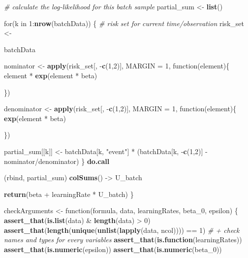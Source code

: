 \documentclass[]{article}
\newenvironment{Shaded}{\begin{snugshade}}{\end{snugshade}}
\newcommand{\KeywordTok}[1]{\textcolor[rgb]{0.13,0.29,0.53}{\textbf{{#1}}}}
\newcommand{\DataTypeTok}[1]{\textcolor[rgb]{0.13,0.29,0.53}{{#1}}}
\newcommand{\DecValTok}[1]{\textcolor[rgb]{0.00,0.00,0.81}{{#1}}}
\newcommand{\StringTok}[1]{\textcolor[rgb]{0.31,0.60,0.02}{{#1}}}
\newcommand{\CommentTok}[1]{\textcolor[rgb]{0.56,0.35,0.01}{\textit{{#1}}}}
\newcommand{\NormalTok}[1]{{#1}}
\begin{document}
\begin{Shaded}
\begin{Highlighting}[]
{  \CommentTok{# calculate the log-likelihood for this batch sample}
  \NormalTok{partial_sum <-}\StringTok{ }\KeywordTok{list}\NormalTok{()}
  
  \NormalTok{for(k in }\DecValTok{1}\NormalTok{:}\KeywordTok{nrow}\NormalTok{(batchData)) \{}
    \CommentTok{# risk set for current time/observation}
    \NormalTok{risk_set <-}\StringTok{ }\NormalTok{batchData %>%}\StringTok{ }\KeywordTok{filter}\NormalTok{(times >=}\StringTok{ }\NormalTok{batchData$times[k])}
    
    \NormalTok{nominator <-}\StringTok{ }\KeywordTok{apply}\NormalTok{(risk_set[, -}\KeywordTok{c}\NormalTok{(}\DecValTok{1}\NormalTok{,}\DecValTok{2}\NormalTok{)], }\DataTypeTok{MARGIN =} \DecValTok{1}\NormalTok{, function(element)\{}
      \NormalTok{element *}\StringTok{ }\KeywordTok{exp}\NormalTok{(element *}\StringTok{ }\NormalTok{beta)}
    \NormalTok{\}) %>%}\StringTok{ }\KeywordTok{rowSums}\NormalTok{()}
      
    \NormalTok{denominator <-}\StringTok{ }\KeywordTok{apply}\NormalTok{(risk_set[, -}\KeywordTok{c}\NormalTok{(}\DecValTok{1}\NormalTok{,}\DecValTok{2}\NormalTok{)], }\DataTypeTok{MARGIN =} \DecValTok{1}\NormalTok{, function(element)\{}
      \KeywordTok{exp}\NormalTok{(element *}\StringTok{ }\NormalTok{beta)}
    \NormalTok{\}) %>%}\StringTok{ }\KeywordTok{rowSums}\NormalTok{()}
      
    \NormalTok{partial_sum[[k]] <-}\StringTok{ }
\StringTok{      }\NormalTok{batchData[k, }\StringTok{"event"}\NormalTok{] *}\StringTok{ }\NormalTok{(batchData[k, -}\KeywordTok{c}\NormalTok{(}\DecValTok{1}\NormalTok{,}\DecValTok{2}\NormalTok{)] -}\StringTok{ }\NormalTok{nominator/denominator)}
  \NormalTok{\}}
  \KeywordTok{do.call}\NormalTok{(rbind, partial_sum) %>%}
\StringTok{    }\KeywordTok{colSums}\NormalTok{() ->}\StringTok{ }\NormalTok{U_batch}
  
  \KeywordTok{return}\NormalTok{(beta +}\StringTok{ }\NormalTok{learningRate *}\StringTok{ }\NormalTok{U_batch)}
\NormalTok{\}}
  
\NormalTok{checkArguments <-}\StringTok{ }\NormalTok{function(formula, data, learningRates,}
                             \NormalTok{beta_0, epsilon) \{}
  \KeywordTok{assert_that}\NormalTok{(}\KeywordTok{is.list}\NormalTok{(data) &}\StringTok{ }\KeywordTok{length}\NormalTok{(data) >}\StringTok{ }\DecValTok{0}\NormalTok{)}
  \KeywordTok{assert_that}\NormalTok{(}\KeywordTok{length}\NormalTok{(}\KeywordTok{unique}\NormalTok{(}\KeywordTok{unlist}\NormalTok{(}\KeywordTok{lapply}\NormalTok{(data, ncol)))) ==}\StringTok{ }\DecValTok{1}\NormalTok{)}
  \CommentTok{# + check names and types for every variables}
  \KeywordTok{assert_that}\NormalTok{(}\KeywordTok{is.function}\NormalTok{(learningRates))}
  \KeywordTok{assert_that}\NormalTok{(}\KeywordTok{is.numeric}\NormalTok{(epsilon))}
  \KeywordTok{assert_that}\NormalTok{(}\KeywordTok{is.numeric}\NormalTok{(beta_0))}
  
}}}}}
\end{Highlighting}
\end{Shaded}
\end{document}
